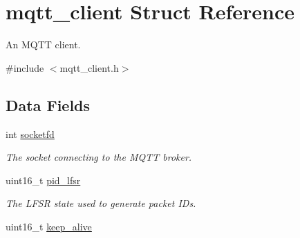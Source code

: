 \hypertarget{structmqtt__client}{}\section{mqtt\+\_\+client Struct Reference}
\label{structmqtt__client}


An M\+Q\+TT client.  




{\ttfamily \#include $<$mqtt\+\_\+client.\+h$>$}

\subsection*{Data Fields}
\begin{DoxyCompactItemize}
\item 
int \hyperlink{structmqtt__client_a9ba39ec6a412d49792bf5f106754eac1}{socketfd}\hypertarget{structmqtt__client_a9ba39ec6a412d49792bf5f106754eac1}{}\label{structmqtt__client_a9ba39ec6a412d49792bf5f106754eac1}

\begin{DoxyCompactList}\small\item\em The socket connecting to the M\+Q\+TT broker. \end{DoxyCompactList}\item 
uint16\+\_\+t \hyperlink{structmqtt__client_a8b11e2b1612858ecd6656d694154698f}{pid\+\_\+lfsr}\hypertarget{structmqtt__client_a8b11e2b1612858ecd6656d694154698f}{}\label{structmqtt__client_a8b11e2b1612858ecd6656d694154698f}

\begin{DoxyCompactList}\small\item\em The L\+F\+SR state used to generate packet ID\textquotesingle{}s. \end{DoxyCompactList}\item 
uint16\+\_\+t \hyperlink{structmqtt__client_aff533344a060e58277698039f547147a}{keep\+\_\+alive}\hypertarget{structmqtt__client_aff533344a060e58277698039f547147a}{}\label{structmqtt__client_aff533344a060e58277698039f547147a}


\end{DoxyCompactItemize}
